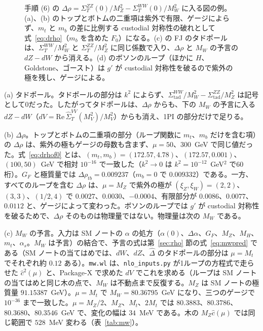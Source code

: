 \documentclass[a4paper,10pt]{ltjsarticle}
\newcommand{\re}{\mathrm{Re}\,}
\begin{document}
\begin{figure}[tbp]
\caption{手順 (6) の $\Delta\rho=\Sigma^{ZZ}_T(0)/M_Z^2-\Sigma^{WW}_T(0)/M_W^2$ に入る図の例。(a)、(b) のトップとボトムの二重項は紫外で有限、ゲージによらず、$m_t$ と $m_b$ の差に比例する custodial 対称性の破れとして式~\eqref{eq:drho}（$m_b$ を含めた $F_0$）になる。(c) の FJ のタドポールは、$\Sigma^{WW}_T/M_W^2$ と $\Sigma^{ZZ}_T/M_Z^2$ に同じ係数で入り、$\Delta\rho$ と $M_W$ の予言の $dZ-dW$ から消える。(d) のボソンのループ（ほかに $H$、Goldstone、ゴースト）は $g'$ が custodial 対称性を破るので紫外の極を残し、ゲージによる。}
\label{fig:drho}
\end{figure}


(a) タドポール。タドポールの部分は $k^2$ によらず、$\Sigma^{WW}_{\mathrm{tad}}/M_W^2-\Sigma^{ZZ}_{\mathrm{tad}}/M_Z^2$ は記号として0だった。したがってタドポールは、$\Delta\rho$ からも、下の $M_W$ の予言に入る $dZ-dW$（$dV=\re\hat\Sigma^{VV}_T(M_V^2)/M_V^2$）からも消え、1PI の部分だけで足りる。

(b) $\Delta\rho$。トップとボトムの二重項の部分（ループ関数に $m_t$、$m_b$ だけを含む項）の $\Delta\rho$ は、紫外の極もゲージの母数も含まず、$\mu=50$、$300$~GeV で同じ値だった。式~\eqref{eq:drhof0} とは、$(m_t,m_b)=(172.57,4.78)$、$(172.57,0.001)$、$(100,50)$~GeV で相対 $10^{-16}$ で一致した（$k^2\to0$ は $k^2=10^{-12}$~GeV$^2$ で60桁）。$G_F$ と極質量では $\Delta\rho_{tb}=0.009237$（$m_b=0$ で $0.009332$）である。一方、すべてのループを含む $\Delta\rho$ は、$\mu=M_Z$ で紫外の極が $(\xi_Z,\xi_W)=(2,2)$、$(3,3)$、$(1/2,4)$ で $0.0027$、$0.0030$、$-0.0004$、有限部分が $0.0086$、$0.0077$、$0.0112$ と、ゲージによって変わった。ボソンのループでは $g'$ が custodial 対称性を破るためで、$\Delta\rho$ そのものは物理量ではない。物理量は次の $M_W$ である。

(c) $M_W$ の予言。入力は SM ノートの $\alpha$ の処方（$\alpha(0)$、$\Delta\alpha$、$G_F$、$M_Z$、$M_H$、$m_t$、$\alpha_s$。$M_W$ は予言）の結合で、予言の式は第~\ref{sec:rho} 節の式~\eqref{eq:mwpred} である（SM ノートの当てはめでは、$dW$、$dZ$、$\hat\Delta$ のタドポールの部分は $\mu=M_t$ でそれぞれ約 $0.12$ ある）。\texttt{mw.wl} は、\texttt{nlo\_inputs.py} が1ループの方程式で走らせた $\hat c^2(\mu)$ と、Package-X で求めた $dV$ でこれを求める（ループは SM ノートの当てはめと同じ木の点で、$M_W$ は不動点まで反復する。$M_Z$ は SM ノートの極質量 $91.15387$~GeV）。$\mu=M_t$ で $M_W=80.36795$~GeV になり、三つのゲージで $10^{-36}$ まで一致した。$\mu=M_Z/2$、$M_Z$、$M_t$、$2M_t$ では $80.3883$、$80.3786$、$80.3680$、$80.3546$~GeV で、変化の幅は $34$~MeV である。木の $M_Z\hat c(\mu)$ では同じ範囲で $528$~MeV 変わる（表~\ref{tab:mw}）。
\end{document}
